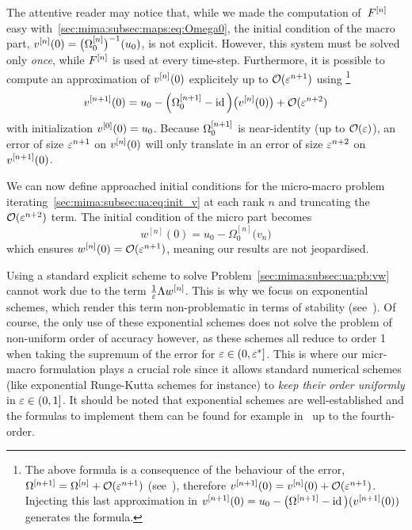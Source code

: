 \begin{remark} \label{mima_rq:init_cond} 
  The attentive reader may notice that, while we made the computation 
  of~$F^{[n]}$ easy with~\eqref{sec:mima:subsec:maps:eq:Omega0}, 
  the initial condition of the macro part, $v^{[n]}(0) = 
  \big( \Omega^{[n]}_0 \big)^{-1}(u_0)$, is not explicit.
  However, this system must be solved only \textit{once}, while $F^{[n]}$ 
  is used at every time-step. 
  Furthermore, it is possible to compute an approximation of $v^{[n]}(0)$ 
  explicitely up to $\mathcal{O}(\varepsilon^{n+1})$ using%
  \footnote{
    The above formula is a consequence of the behaviour of the error, 
    $\Omega^{[n+1]} = \Omega^{[n]} + \mathcal{O}(\varepsilon^{n+1})$ 
    (see~\cite{chartier.2020.new}), therefore $v^{[n+1]}(0) = v^{[n]}(0) 
    + \mathcal{O}(\varepsilon^{n+1})$. Injecting this last approximation in $v^{[n+1]}(0)
    = u_0 - \big( \Omega^{[n+1]} - \operatorname{id} \big) (v^{[n+1]}(0))$ generates the 
    formula.%
  }
  \begin{equation} \label{sec:mima:subsec:ua:eq:init_v}
    v^{[n+1]}(0) = u_0 - \Big( \Omega^{[n+1]}_0 - \operatorname{id} \Big) \big( v^{[n]}(0) \big) 
                  + \mathcal{O}(\varepsilon^{n+2}) 
  \end{equation}
  with initialization $v^{[0]}(0) = u_0$. 
  Because $\Omega^{[n+1]}_0$ is near-identity (up to $\mathcal{O}(\varepsilon)$), an 
  error of size $\varepsilon^{n+1}$ on $v^{[n]}(0)$ will only translate in an 
  error of size $\varepsilon^{n+2}$ on $v^{[n+1]}(0)$.  

  We can now define approached initial conditions for 
  the micro-macro problem iterating~\eqref{sec:mima:subsec:ua:eq:init_v} 
  at each rank $n$ and truncating the $\mathcal{O}(\varepsilon^{n+2})$ 
  term. The initial condition of the micro part becomes 
  \begin{equation} \label{mima_eq:mima_approx_init}
  w^{[n]}(0) = u_0 - \Omega^{[n]}_0 \big( v_{n} \big)
  \end{equation}
  which ensures $w^{[n]}(0) = \mathcal{O}(\varepsilon^{n+1})$, meaning our results are 
  not jeopardised. 
\end{remark}
    


\newcommand{\modnorm}[1]{\left\vert #1 \right\vert _{\eps} }

Using a standard explicit scheme to solve Problem~\eqref{sec:mima:subsec:ua:pb:vw} 
cannot work due to the term $\frac{1}{\varepsilon}\Lambda w^{[n]}$. 
This is why we focus on exponential schemes, which render this term non-problematic in terms of stability (see~\cite{maset.2009.unconditional}). 
Of course, the only use of these exponential schemes does not solve the problem of non-uniform order of accuracy however, as these schemes all reduce to order 1 when taking the supremum of the error for $\varepsilon \in (0, \varepsilon^*]$.  This is where our micr-macro formulation plays a crucial role since it allows standard numerical schemes (like exponential Runge-Kutta schemes for instance)  to {\em keep their order uniformly} in $\varepsilon\in (0,1]$.
It should be noted that exponential schemes are well-established 
and the formulas to implement them can be found for example in~\cite{hochbruck.2005.explicit} up to the fourth-order. 
%

